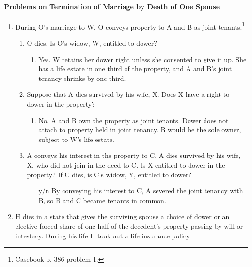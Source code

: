 \paragraph{Problems on Termination of Marriage by Death of One Spouse}

\begin{enumerate}
    \item During O's marriage to W, O conveys property to A and B as joint 
    tenants.\footnote{Casebook p. 386 problem 1.}
    \begin{enumerate}
        \item O dies. Is O's widow, W, entitled to dower?
        \begin{enumerate}
            \item Yes. W retains her dower right unless she consented to give 
            it up. She has a life estate in one third of the property, and A 
            and B's joint tenancy shrinks by one third.
        \end{enumerate}
        \item Suppose that A dies survived by his wife, X. Does X have a right 
        to dower in the property?
        \begin{enumerate}
            \item No. A and B own the property as joint tenants. Dower does 
            not attach to property held in joint tenancy. B would be the sole 
            owner, subject to W's life estate.
        \end{enumerate}
        \item A conveys his interest in the property to C. A dies survived by 
        his wife, X, who did not join in the deed to C. Is X entitled to dower 
        in the property? If C dies, is C's widow, Y, entitled to dower?
        \begin{enumerate}
            \item [y/n] By conveying his interest to C, A severed the joint 
            tenancy with B, so B and C became tenants in common.
        \end{enumerate}
    \end{enumerate}
    \item H dies in a state that gives the surviving spouse a choice of dower 
    or an elective forced share of one-half of the decedent's property passing 
    by will or intestacy. During his life H took out a life insurance policy 

\end{enumerate}
